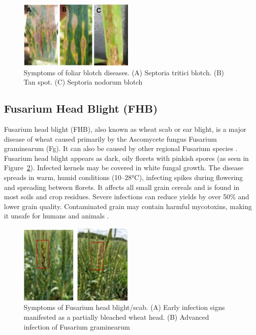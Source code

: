 \begin{figure}[H]
    \centering
    \includegraphics[width=0.5\textwidth]{chapters/chapter2/images/Figure06.png}
    \caption{Symptoms of foliar blotch diseases. (A) Septoria tritici blotch. (B) Tan spot. (C) Septoria nodorum blotch \protect\parencite{figueroa2018review}}
    \label{fig:Figure06}
\end{figure}

\subsection{Fusarium Head Blight (FHB)}
Fusarium head blight (FHB), also known as wheat scab or ear blight, is a major disease of wheat caused primarily by the Ascomycete fungus Fusarium graminearum (Fg). It can also be caused by other regional Fusarium species \parencite{figueroa2018review}.
Fusarium head blight appears as dark, oily florets with pinkish spores (as seen in Figure~\ref{fig:Figure07}). Infected kernels may be covered in white fungal growth. The disease spreads in warm, humid conditions (10–28°C), infecting spikes during flowering and spreading between florets. It affects all small grain cereals and is found in most soils and crop residues. Severe infections can reduce yields by over 50\%  and lower grain quality. Contaminated grain may contain harmful mycotoxins, making it unsafe for humans and animals \parencite{duveiller2012wheat}.

\begin{figure}[H]
    \centering
    \includegraphics[width=0.5\textwidth]{chapters/chapter2/images/Figure07.png}
    \caption{Symptoms of Fusarium head blight/scab. (A) Early infection signs manifested as a partially bleached wheat head. (B) Advanced infection of Fusarium graminearum \protect\parencite{figueroa2018review}}
    \label{fig:Figure07}
\end{figure}


